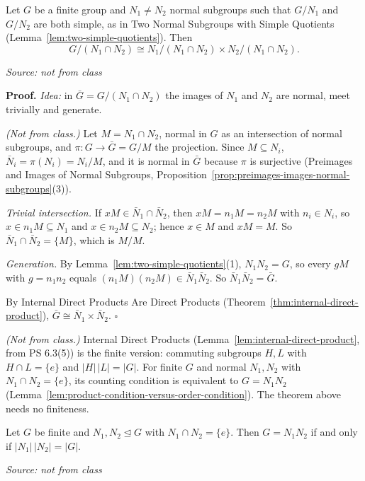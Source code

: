 \documentclass[11pt]{report}
\renewenvironment{proof}[1][Proof]{\noindent\textbf{#1.} }{\hfill$\square$\par\vspace{5pt}}
\newcommand{\srcline}[1]{\par\hfill{\footnotesize\textit{Source: #1}}}
\begin{document}
\begin{corbox}\label{cor:two-simple-quotients-product}
Let $G$ be a finite group and $N_1 \neq N_2$ normal subgroups such that $G/N_1$ and $G/N_2$ are both simple, as in Two Normal Subgroups with Simple Quotients (Lemma~\ref{lem:two-simple-quotients}). Then
\[ G/(N_1 \cap N_2) \cong N_1/(N_1 \cap N_2) \times N_2/(N_1 \cap N_2). \]
\srcline{not from class}
\end{corbox}

\begin{proof}
\textit{Idea:} in $\bar G = G/(N_1 \cap N_2)$ the images of $N_1$ and $N_2$ are normal, meet trivially and generate.\par
\textit{(Not from class.)} Let $M = N_1 \cap N_2$, normal in $G$ as an intersection of normal subgroups, and $\pi: G \to \bar G = G/M$ the projection. Since $M \subseteq N_i$, $\bar N_i = \pi(N_i) = N_i/M$, and it is normal in $\bar G$ because $\pi$ is surjective (Preimages and Images of Normal Subgroups, Proposition~\ref{prop:preimages-images-normal-subgroups}(3)).

\emph{Trivial intersection.} If $xM \in \bar N_1 \cap \bar N_2$, then $xM = n_1M = n_2M$ with $n_i \in N_i$, so $x \in n_1M \subseteq N_1$ and $x \in n_2M \subseteq N_2$; hence $x \in M$ and $xM = M$. So $\bar N_1 \cap \bar N_2 = \{M\}$, which is $M/M$.

\emph{Generation.} By Lemma~\ref{lem:two-simple-quotients}(1), $N_1N_2 = G$, so every $gM$ with $g = n_1n_2$ equals $(n_1M)(n_2M) \in \bar N_1 \bar N_2$. So $\bar N_1 \bar N_2 = \bar G$.

By Internal Direct Products Are Direct Products (Theorem~\ref{thm:internal-direct-product}), $\bar G \cong \bar N_1 \times \bar N_2$.
\end{proof}

\begin{rembox}\label{rem:two-direct-product-criteria}
\textit{(Not from class.)} Internal Direct Products (Lemma~\ref{lem:internal-direct-product}, from PS 6.3(5)) is the finite version: commuting subgroups $H, L$ with $H \cap L = \{e\}$ and $|H|\,|L| = |G|$. For finite $G$ and normal $N_1, N_2$ with $N_1 \cap N_2 = \{e\}$, its counting condition is equivalent to $G = N_1N_2$ (Lemma~\ref{lem:product-condition-versus-order-condition}). The theorem above needs no finiteness.
\end{rembox}

\begin{lembox}[{$G = N_1N_2$ Versus $|N_1|\,|N_2| = |G|$}]\label{lem:product-condition-versus-order-condition}
Let $G$ be finite and $N_1, N_2 \trianglelefteq G$ with $N_1 \cap N_2 = \{e\}$. Then $G = N_1N_2$ if and only if $|N_1|\,|N_2| = |G|$.
\srcline{not from class}
\end{lembox}
\end{document}
